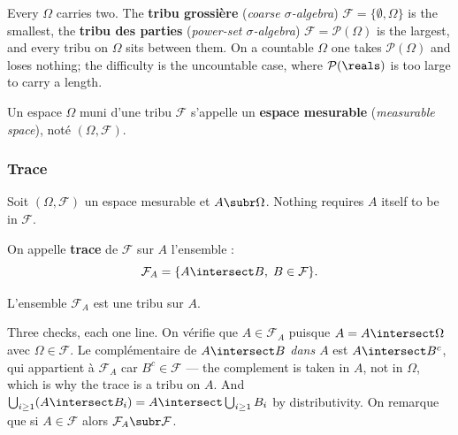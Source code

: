 \begin{remark}
  Every $\Omega$ carries two. The \textbf{tribu grossière} (\textit{coarse
  $\sigma$-algebra}) $\mathcal{F} = \{\emptyset, \Omega\}$ is the smallest, the
  \textbf{tribu des parties} (\textit{power-set $\sigma$-algebra}) $\mathcal{F} =
  \mathcal{P}(\Omega)$ is the largest, and every tribu on $\Omega$ sits between
  them. On a countable $\Omega$ one takes $\mathcal{P}(\Omega)$ and loses nothing;
  the difficulty is the uncountable case, where $\mathcal{P}(\reals)$ is too large
  to carry a length.
\end{remark}

\begin{definition}
  Un espace $\Omega$ muni d'une tribu $\mathcal{F}$ s'appelle un
  \textbf{espace mesurable} (\textit{measurable space}), noté
  $(\Omega,\mathcal{F})$.
\end{definition}

\subsubsection{Trace}

Soit $(\Omega,\mathcal{F})$ un espace mesurable et $A \subr \Omega$. Nothing
requires $A$ itself to be in $\mathcal{F}$.

\begin{definition}[Trace]
  On appelle \textbf{trace} de $\mathcal{F}$ sur $A$ l'ensemble :
  \[
    \mathcal{F}_{A} = \{A \intersect B, \; B \in \mathcal{F}\}.
  \]
\end{definition}

\begin{prop}
  L'ensemble $\mathcal{F}_{A}$ est une tribu sur $A$.
\end{prop}

\begin{remark}
  Three checks, each one line. On vérifie que $A \in \mathcal{F}_{A}$ puisque $A =
  A \intersect \Omega$ avec $\Omega \in \mathcal{F}$. Le complémentaire de $A
  \intersect B$ \emph{dans $A$} est $A \intersect B^{c}$, qui appartient à
  $\mathcal{F}_{A}$ car $B^{c} \in \mathcal{F}$ --- the complement is taken in $A$,
  not in $\Omega$, which is why the trace is a tribu on $A$. And $\bigcup_{i \geq
  1}(A \intersect B_{i}) = A \intersect \bigcup_{i \geq 1} B_{i}$ by distributivity.
  On remarque que si $A \in \mathcal{F}$ alors $\mathcal{F}_{A} \subr \mathcal{F}$.
\end{remark}

